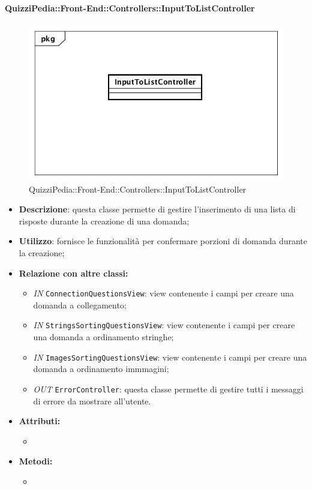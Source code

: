 \paragraph{QuizziPedia::Front-End::Controllers::InputToListController}
\begin{figure}
	\centering
	\includegraphics[scale=0.45]{UML/Classi/Front-End/QuizziPedia_Front-end_Controller_InputToListController.png}
	\caption{QuizziPedia::Front-End::Controllers::InputToListController}
\end{figure}
\begin{itemize}
	\item \textbf{Descrizione}: questa classe permette di gestire l'inserimento di una lista di risposte durante la creazione di una domanda;
	\item \textbf{Utilizzo}: fornisce le funzionalità per confermare porzioni di domanda durante la creazione;
	\item \textbf{Relazione con altre classi:}
	\begin{itemize}
		\item \textit{IN} \texttt{ConnectionQuestionsView}: view contenente i campi per creare una domanda a collegamento;
		\item \textit{IN} \texttt{StringsSortingQuestionsView}: view contenente i campi per creare una domanda a ordinamento stringhe; 
		\item \textit{IN} \texttt{ImagesSortingQuestionsView}: view contenente i campi per creare una domanda a ordinamento immmagini;
		\item \textit{OUT} \texttt{ErrorController}: questa classe permette di gestire tutti i messaggi di errore da mostrare all'utente. 
	\end{itemize}
	\item \textbf{Attributi:}
	\begin{itemize}
		\item 
	\end{itemize}
	\item \textbf{Metodi:}
	\begin{itemize}
		\item 
	\end{itemize}
\end{itemize}


